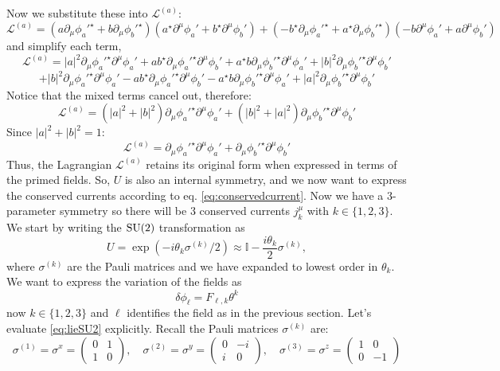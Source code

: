    Now we substitute these into \(\mathcal L^{(a)}\):
   \[
   \mathcal L^{(a)} = (a \partial_\mu \phi_a'^\star + b \partial_\mu \phi_b'^\star)(a^\star \partial^\mu \phi_a' + b^\star \partial^\mu \phi_b') + (-b^\star \partial_\mu \phi_a'^\star + a^\star \partial_\mu \phi_b'^\star)(-b \partial^\mu \phi_a' + a \partial^\mu \phi_b')
   \]
   and simplify each term,
   \[
   \mathcal L^{(a)} = |a|^2 \partial_\mu \phi_a'^\star \partial^\mu \phi_a' + a b^\star \partial_\mu \phi_a'^\star \partial^\mu \phi_b' + a^\star b \partial_\mu \phi_b'^\star \partial^\mu \phi_a' + |b|^2 \partial_\mu \phi_b'^\star \partial^\mu \phi_b'
   \]
   \[
   + |b|^2 \partial_\mu \phi_a'^\star \partial^\mu \phi_a' - a b^\star \partial_\mu \phi_a'^\star \partial^\mu \phi_b' - a^\star b \partial_\mu \phi_b'^\star \partial^\mu \phi_a' + |a|^2 \partial_\mu \phi_b'^\star \partial^\mu \phi_b'
   \]
   Notice that the mixed terms cancel out, therefore:
   \[
   \mathcal L^{(a)} = (|a|^2 + |b|^2) \partial_\mu \phi_a'^\star \partial^\mu \phi_a' + (|b|^2 + |a|^2) \partial_\mu \phi_b'^\star \partial^\mu \phi_b' 
   \]
   Since \(|a|^2 + |b|^2 = 1\):
   \[
   \mathcal L^{(a)} = \partial_\mu \phi_a'^\star \partial^\mu \phi_a' + \partial_\mu \phi_b'^\star \partial^\mu \phi_b'
   \]
Thus, the Lagrangian \( \mathcal L^{(a)} \) retains its original form when expressed in terms of the primed fields.
So, $U$ is also an internal symmetry, and we now want to express the conserved currents according to eq. \eqref{eq:conservedcurrent}. Now we have a 3-parameter symmetry so there will be 3 conserved currents $j^\mu_k$ with $k\in\{1,2,3\}$. 
We start by writing the ${\rm SU}(2)$ transformation as 
\begin{equation}
    U=\exp (-i \theta_k \sigma^{(k)}/2) \approx  \mathbb I - \frac{i\theta_k }{2}\sigma^{(k)}, \label{eq:lieSU2}
\end{equation}
where $\sigma^{(k)}$ are the Pauli matrices and we have expanded to lowest order in $\theta_k$. 
We want to express the variation of the fields as
\begin{equation}
\delta \phi_\ell = F_{\ell,k} \theta^k\label{eq:defF}
\end{equation}
now $k\in\{1,2,3\}$ and $\ell$ identifies the field as in the previous section. 
Let's evaluate \eqref{eq:lieSU2} explicitly. Recall the Pauli matrices \(\sigma^{(k)}\) are:
   \[
   \sigma^{(1)} = \sigma^x = \begin{pmatrix} 0 & 1 \\ 1 & 0 \end{pmatrix}, \quad \sigma^{(2)} = \sigma^y = \begin{pmatrix} 0 & -i \\ i & 0 \end{pmatrix}, \quad \sigma^{(3)} = \sigma^z = \begin{pmatrix} 1 & 0 \\ 0 & -1 \end{pmatrix}
   \]

